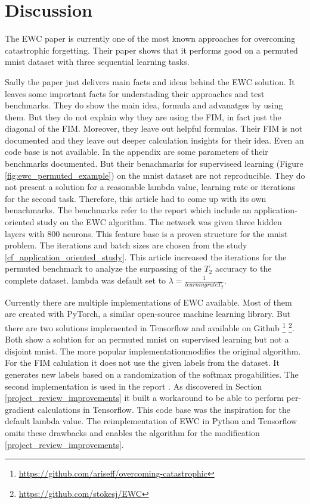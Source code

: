 \chapter{Discussion}

The EWC paper is currently one of the most known approaches for overcoming catastrophic forgetting.
Their paper shows that it performs good on a permuted mnist dataset with three sequential learning tasks.

Sadly the paper just delivers main facts and ideas behind the EWC solution.
It leaves some important facts for understading their approaches and test benchmarks.
They do show the main idea, formula and advanatges by using them.
But they do not explain why they are using the FIM, in fact just the diagonal of the FIM.
Moreover, they leave out helpful formulas.
Their FIM is not documented and they leave out deeper calculation insights for their idea.
Even an code base is not available.
In the appendix are some parameters of their benchmarks documented.
But their benachmarks for superviseed learning (Figure \ref{fig:ewc_permuted_example}) on the mnist dataset are not reproducible.
They do not present a solution for a reasonable lambda value, learning rate or iterations for the second task.
Therefore, this article had to come up with its own benachmarks.
The benchmarks refer to the report \cite{cf_application_oriented_study} which include an application-oriented study on the EWC algorithm.
The network was given three hidden layers with 800 neurons.
This feature base is a proven structure for the mnist problem.
The iterations and batch sizes are chosen from the study \ref{cf_application_oriented_study}.
This article increased the iterations for the permuted benchmark to analyze the surpassing of the $T_2$ accuracy to the complete dataset.
lambda was default set to $\lambda = \frac{1}{learningrate T_2}$.

Currently there are multiple implementations of EWC available.
Most of them are created with PyTorch, a similar open-source machine learning library.
But there are two solutions implemented in Tensorflow and available on Github
\footnote[1]{\url{https://github.com/ariseff/overcoming-catastrophic}}
\footnote[2]{\url{https://github.com/stokesj/EWC}}.
Both show a solution for an permuted mnist on supervised learning but not a disjoint mnist.
The more popular implementation\footnotemark[1] modifies the original algorithm.
For the FIM calulation it does not use the given labels from the dataset.
It generates new labels based on a randomization of the softmax progabilities.
The second implementation \footnotemark[2] is used in the report \cite{cf_application_oriented_study}.
As discovered in Section \ref{project_review_improvements} it built a workaround to be able to perform per-gradient calculations in Tensorflow.
This code base was the inspiration for the default lambda value.
\newline
The reimplementation of EWC in Python and Tensorflow omits these drawbacks and enables the algorithm for the modification \ref{project_review_improvements}.

